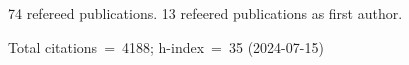 74 refereed publications. 13 refeered publications as first author.

Total citations~=~4188; h-index~=~35 (2024-07-15)